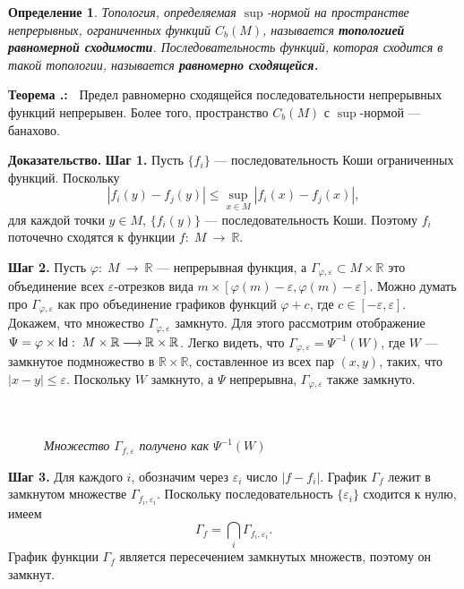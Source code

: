 \documentclass[12pt]{book}
\newcommand{\arrow}{{\:\longrightarrow\:}}
\renewcommand{\phi}{\varphi}
\renewcommand{\epsilon}{\varepsilon}
\def\Id{{\operatorname{\sf Id}}}
\def\R{{\mathbb R}}
\theoremstyle{upshape}
\theoremstyle{generic}
\newtheorem{opredelenie}[teorema]{Определение}
\def\еза{\end{remark}}
\theoremstyle{upshapenonumber}
\newcommand{\следствие}{%
     \refstepcounter{teorema}
     {\noindent\bf Следствие \thechapter.\arabic{teorema}:\ }}
\newcommand{\пример}{%
     \refstepcounter{teorema}
     {\noindent\bf Пример \thechapter.\arabic{teorema}:\ }}
\newcommand{\лемма}{%
     \refstepcounter{teorema}
     {\noindent\bf Лемма \thechapter.\arabic{teorema}:\ }}
\newcommand{\теорема}{%
     \refstepcounter{teorema}
     {\noindent\bf Теорема \thechapter.\arabic{teorema}:\ }}
\newcommand{\утверждение}{%
     \refstepcounter{teorema}
     {\noindent\bf Утверждение \thechapter.\arabic{teorema}:\ }}
\def\хфилл{\hfill}
\def\ноиндент{\noindent}
\def\бф{\bf}
\def\ем{\em}
\def\ез{\end{zadacha}}
\def\еу{\end{ukazanie}}
\def\определение{\begin{opredelenie}}
\def\ео{\end{opredelenie}}
\def\енум{\begin{enumerate}}
\def\ее{\end{enumerate}}
\begin{document}
\определение
Топология, определяемая $\sup$-нормой
на пространстве непрерывных, ограниченных функций
$C_b(M)$, называется {\бф топологией равномерной
сходимости}. Последовательность функций,
которая сходится в такой топологии,
называется {\бф равномерно сходящейся.}
\ео




\теорема\label{_sup_norma_Banach_Theorem_}
Предел равномерно сходящейся последовательности
непрерывных функций непрерывен. Более того,
пространство $C_b(M)$ с $\sup$-нормой --- банахово.

\хфилл

\ноиндент
{\бф Доказательство.} {\бф Шаг 1.}
Пусть $\{f_i\}$ --- последовательность Коши 
ограниченных функций. Поскольку 
\[ |f_i(y)-f_j(y)| \leq \sup_{x\in M} |f_i(x)-f_j(x)|,\]
для каждой точки $y\in M$, $\{f_i(y)\}$ ---
последовательность
Коши. Поэтому $f_i$ поточечно сходятся к функции $f:\; M \arrow \R$.

\хфилл

\ноиндент
{\бф Шаг 2.} Пусть 
$\phi:\; M \arrow \R$ --- непрерывная функция, а 
$\Gamma_{\phi, \epsilon}\subset M \times \R$ это объединение всех
$\epsilon$-отрезков вида $m\times [\phi(m)-\epsilon, \phi(m)-\epsilon]$.
Можно думать про $\Gamma_{\phi, \epsilon}$ как про объединение графиков
функций $\phi+c$, где $c\in[-\epsilon, \epsilon]$.
Докажем, что множество $\Gamma_{\phi, \epsilon}$
замкнуто. Для этого рассмотрим отображение
$\Psi=\phi\times \Id:\; M \times \R\arrow \R \times \R$.
Легко видеть, что $\Gamma_{\phi, \epsilon} = \Psi^{-1}(W)$,
где $W$ --- замкнутое подмножество в $\R\times \R$,
составленное из всех пар $(x, y)$, таких, что $|x-y| \leq \epsilon$.
Поскольку $W$ замкнуто, а $\Psi$ непрерывна, $\Gamma_{\phi, \epsilon}$
также замкнуто.

\begin{figure}[ht]
\begin{center}\ \\
\\
{\small \em Множество $\Gamma_{f, \epsilon}$ получено как $\Psi^{-1}(W)$}
\end{center}
\end{figure}


\хфилл

\ноиндент
{\бф Шаг 3.} Для каждого $i$, обозначим через $\epsilon_i$
число $|f-f_i|$. График $\Gamma_f$ лежит в 
замкнутом множестве $\Gamma_{f_i, \epsilon_i}$.
Поскольку последовательность $\{\epsilon_i\}$
сходится к нулю, имеем
\[
\Gamma_f = \bigcap_i \Gamma_{f_i, \epsilon_i}.
\]
График функции $\Gamma_f$ является пересечением
замкнутых множеств, поэтому он замкнут.
\end{document}

